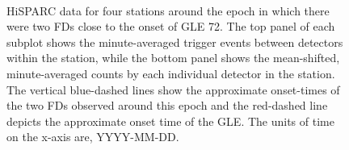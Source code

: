 \begin{figure}[ht]
	\centering
	 \\
	
	\qquad
	
	
	\caption{HiSPARC data for four stations around the epoch in which there were two FDs close to the onset of GLE 72. The top panel of each subplot shows the minute-averaged trigger events between detectors within the station, while the bottom panel shows the mean-shifted, minute-averaged counts by each individual detector in the station. The vertical blue-dashed lines show the approximate onset-times of the two FDs observed around this epoch and the red-dashed line depicts the approximate onset time of the GLE. The units of time on the x-axis are, YYYY-MM-DD.}
	\label{fig:FD_GLE72}
\end{figure}

